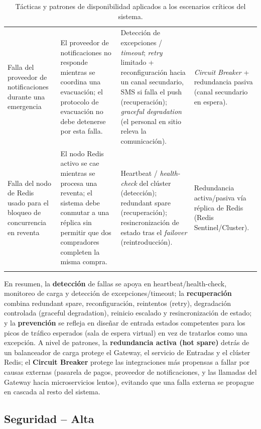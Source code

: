 \documentclass[12pt,a4paper]{article}
\begin{document}
\begin{center}
\begin{longtable}{p{2.6cm}p{4.7cm}p{3.6cm}p{2.9cm}}
Falla del proveedor de notificaciones durante una emergencia &
El proveedor de notificaciones no responde mientras se coordina una evacuación; el protocolo de
evacuación no debe detenerse por esta falla. &
Detección de excepciones / \textit{timeout}; \textit{retry} limitado + reconfiguración hacia un
canal secundario, SMS si falla el push (recuperación); \textit{graceful degradation} (el personal
en sitio releva la comunicación). &
\textit{Circuit Breaker} + redundancia pasiva (canal secundario en espera).\\[0.5em]

Falla del nodo de Redis usado para el bloqueo de concurrencia en reventa &
El nodo Redis activo se cae mientras se procesa una reventa; el sistema debe conmutar a una
réplica sin permitir que dos compradores completen la misma compra. &
Heartbeat / \textit{health-check} del clúster (detección); redundant spare (recuperación);
resincronización de estado tras el \textit{failover} (reintroducción). &
Redundancia activa/pasiva vía réplica de Redis (Redis Sentinel/Cluster).\\
\bottomrule
\caption{Tácticas y patrones de disponibilidad aplicados a los escenarios críticos del sistema.}
\label{tab:tacticas-disponibilidad}
\end{longtable}
\end{center}

En resumen, la \textbf{detección} de fallas se apoya en heartbeat/health-check, monitoreo de
carga y detección de excepciones/timeout; la \textbf{recuperación} combina redundant spare,
reconfiguración, reintentos (retry), degradación controlada (graceful degradation), reinicio
escalado y resincronización de estado; y la \textbf{prevención} se refleja en diseñar de entrada
estados competentes para los picos de tráfico esperados (sala de espera virtual) en vez de
tratarlos como una excepción. A nivel de patrones, la \textbf{redundancia activa (hot spare)}
detrás de un balanceador de carga protege el Gateway, el servicio de Entradas y el clúster Redis;
el \textbf{Circuit Breaker} protege las integraciones más propensas a fallar por causas externas
(pasarela de pagos, proveedor de notificaciones, y las llamadas del Gateway hacia microservicios
lentos), evitando que una falla externa se propague en cascada al resto del sistema.

\subsection{Seguridad -- Alta}
\end{document}
